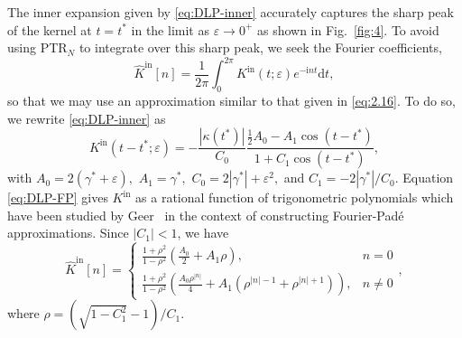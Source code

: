\documentclass{article}[12pt]
\renewcommand{\epsilon}{\varepsilon}
\numberwithin{equation}{section}
\begin{document}
The inner expansion given by \eqref{eq:DLP-inner} accurately captures
the sharp peak of the kernel at $t = t^{\ast}$ in the
limit as $\epsilon \to 0^{+}$ as shown in
  Fig.~\ref{fig:4}. To avoid using PTR$_{N}$ to
integrate over this sharp peak, we seek the Fourier coefficients,
\begin{equation}
  \hat{K}^{\text{in}}[n] = \frac{1}{2\pi} \int_{0}^{2\pi}
  K^{\text{in}}(t;\epsilon) e^{-\mathrm{i} n t} \mathrm{d}t,
  \label{eq:3.19}
\end{equation}
so that we may use an approximation similar to that given in
\eqref{eq:2.16}. To do so, we rewrite \eqref{eq:DLP-inner} as
\begin{equation}
  K^{\text{in}}(t - t^{\ast};\epsilon) = - \frac{| \kappa(t^{\ast})
    |}{C_{0}} \frac{ \frac{1}{2} A_{0} - A_{1} \cos(t - t^{\ast})}{ 1 +
      C_{1} \cos(t - t^{\ast} )},
    \label{eq:DLP-FP}
\end{equation}
with $A_{0} = 2 ( \gamma^{\ast} + \epsilon ),$
$A_{1} = \gamma^{\ast},$ $C_{0} = 2 | \gamma^{\ast} | + \epsilon^{2},$
and $C_{1} = - 2 |\gamma^{\ast}| / C_{0}.$ Equation \eqref{eq:DLP-FP}
gives $K^{\text{in}}$ as a rational function of trigonometric
polynomials which have been studied by Geer~\cite{geer1995rational} in
the context of constructing Fourier-Pad\'e approximations. Since
$|C_{1}| < 1$, we have
 \begin{equation}
  \hat{K}^{\text{in}}[n] = 
  \begin{cases}
    \frac{1 + \rho^{2}}{1 - \rho^{2}} \left( \frac{A_{0}}{2} + A_{1}
      \rho \right), & n = 0\\
    \frac{1 + \rho^{2}}{1 - \rho^{2}} \left( \frac{A_{0}
        \rho^{|n|}}{4} + A_{1} ( \rho^{|n|-1} + \rho^{|n|+1} )
    \right), & n \neq 0
    \end{cases}, 
    \label{eq:DLP-Fourier}
\end{equation} 
where $\rho = \left(\sqrt{1 - C_{1}^{2}} - 1 \right)/C_{1}$.
\end{document}
